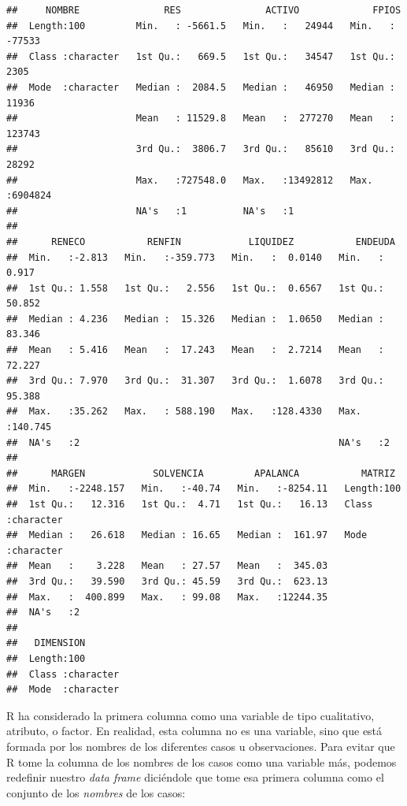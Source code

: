 \documentclass[
]{book}
\begin{document}
\begin{verbatim}
##     NOMBRE               RES               ACTIVO             FPIOS        
##  Length:100         Min.   : -5661.5   Min.   :   24944   Min.   : -77533  
##  Class :character   1st Qu.:   669.5   1st Qu.:   34547   1st Qu.:   2305  
##  Mode  :character   Median :  2084.5   Median :   46950   Median :  11936  
##                     Mean   : 11529.8   Mean   :  277270   Mean   : 123743  
##                     3rd Qu.:  3806.7   3rd Qu.:   85610   3rd Qu.:  28292  
##                     Max.   :727548.0   Max.   :13492812   Max.   :6904824  
##                     NA's   :1          NA's   :1                           
## 
##      RENECO           RENFIN            LIQUIDEZ           ENDEUDA       
##  Min.   :-2.813   Min.   :-359.773   Min.   :  0.0140   Min.   :  0.917  
##  1st Qu.: 1.558   1st Qu.:   2.556   1st Qu.:  0.6567   1st Qu.: 50.852  
##  Median : 4.236   Median :  15.326   Median :  1.0650   Median : 83.346  
##  Mean   : 5.416   Mean   :  17.243   Mean   :  2.7214   Mean   : 72.227  
##  3rd Qu.: 7.970   3rd Qu.:  31.307   3rd Qu.:  1.6078   3rd Qu.: 95.388  
##  Max.   :35.262   Max.   : 588.190   Max.   :128.4330   Max.   :140.745  
##  NA's   :2                                              NA's   :2        
## 
##      MARGEN            SOLVENCIA         APALANCA           MATRIZ         
##  Min.   :-2248.157   Min.   :-40.74   Min.   :-8254.11   Length:100        
##  1st Qu.:   12.316   1st Qu.:  4.71   1st Qu.:   16.13   Class :character  
##  Median :   26.618   Median : 16.65   Median :  161.97   Mode  :character  
##  Mean   :    3.228   Mean   : 27.57   Mean   :  345.03                     
##  3rd Qu.:   39.590   3rd Qu.: 45.59   3rd Qu.:  623.13                     
##  Max.   :  400.899   Max.   : 99.08   Max.   :12244.35                     
##  NA's   :2                                                                 
## 
##   DIMENSION        
##  Length:100        
##  Class :character  
##  Mode  :character
\end{verbatim}

R ha considerado la primera columna como una variable de tipo cualitativo, atributo, o factor. En realidad, esta columna no es una variable, sino que está formada por los nombres de los diferentes casos u observaciones. Para evitar que R tome la columna de los nombres de los casos como una variable más, podemos redefinir nuestro \emph{data frame} diciéndole que tome esa primera columna como el conjunto de los \emph{nombres} de los casos:
\end{document}
